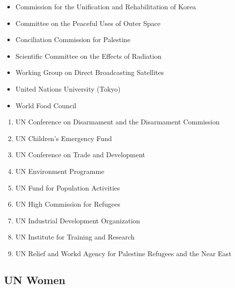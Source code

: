 \documentclass[
  openany]{book}
\providecommand{\tightlist}{%
  \setlength{\itemsep}{0pt}\setlength{\parskip}{0pt}}
\begin{document}
\begin{itemize}
\tightlist
\item
  Commission for the Unification and Rehabilitation of Korea
\item
  Committee on the Peaceful Uses of Outer Space
\item
  Conciliation Commission for Palestine
\item
  Scientific Committee on the Effects of Radiation
\item
  Working Group on Direct Broadcasting Satellites
\item
  United Nations University (Tokyo)
\item
  World Food Council
\end{itemize}

\begin{enumerate}
\def\labelenumi{\arabic{enumi}.}
\setcounter{enumi}{3}
\tightlist
\item
  UN Conference on Disarmament and the Disarmament Commission
\item
  UN Children's Emergency Fund
\item
  UN Conference on Trade and Development
\item
  UN Environment Programme
\item
  UN Fund for Population Activities
\item
  UN High Commission for Refugees
\item
  UN Industrial Development Organization
\item
  UN Institute for Training and Research
\item
  UN Relief and Workd Agency for Palestine Refugees and the Near East
\end{enumerate}

\hypertarget{un-women}{%
\subsection{UN Women}\label{un-women}}
\end{document}
